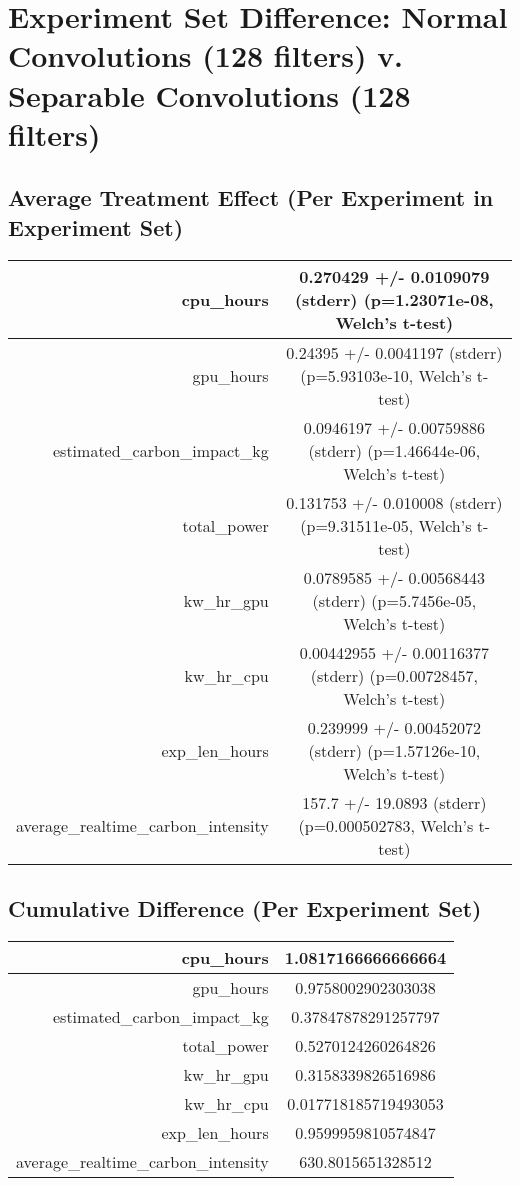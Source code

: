 \documentclass{article}%
\begin{document}
%
\normalsize%
\section{Experiment Set Difference: Normal Convolutions (128 filters) v. Separable Convolutions (128 filters)}%
\label{sec:Experiment Set Difference Normal Convolutions (128 filters) v. Separable Convolutions (128 filters)}%
\subsection{Average Treatment Effect (Per Experiment in Experiment Set)}%
\label{subsec:Average Treatment Effect (Per Experiment in Experiment Set)}%
\begin{tabular}{|r|c|}%
\hline%
cpu\_hours&0.270429 +/{-} 0.0109079 (stderr) (p=1.23071e{-}08, Welch's t{-}test)\\%
\hline%
gpu\_hours&0.24395 +/{-} 0.0041197 (stderr) (p=5.93103e{-}10, Welch's t{-}test)\\%
\hline%
estimated\_carbon\_impact\_kg&0.0946197 +/{-} 0.00759886 (stderr) (p=1.46644e{-}06, Welch's t{-}test)\\%
\hline%
total\_power&0.131753 +/{-} 0.010008 (stderr) (p=9.31511e{-}05, Welch's t{-}test)\\%
\hline%
kw\_hr\_gpu&0.0789585 +/{-} 0.00568443 (stderr) (p=5.7456e{-}05, Welch's t{-}test)\\%
\hline%
kw\_hr\_cpu&0.00442955 +/{-} 0.00116377 (stderr) (p=0.00728457, Welch's t{-}test)\\%
\hline%
exp\_len\_hours&0.239999 +/{-} 0.00452072 (stderr) (p=1.57126e{-}10, Welch's t{-}test)\\%
\hline%
average\_realtime\_carbon\_intensity&157.7 +/{-} 19.0893 (stderr) (p=0.000502783, Welch's t{-}test)\\%
\hline%
\end{tabular}

%
\subsection{Cumulative Difference (Per Experiment Set)}%
\label{subsec:Cumulative Difference (Per Experiment Set)}%
\begin{tabular}{|r|c|}%
\hline%
cpu\_hours&1.0817166666666664\\%
\hline%
gpu\_hours&0.9758002902303038\\%
\hline%
estimated\_carbon\_impact\_kg&0.37847878291257797\\%
\hline%
total\_power&0.5270124260264826\\%
\hline%
kw\_hr\_gpu&0.3158339826516986\\%
\hline%
kw\_hr\_cpu&0.017718185719493053\\%
\hline%
exp\_len\_hours&0.9599959810574847\\%
\hline%
average\_realtime\_carbon\_intensity&630.8015651328512\\%
\hline%
\end{tabular}

%
\end{document}
